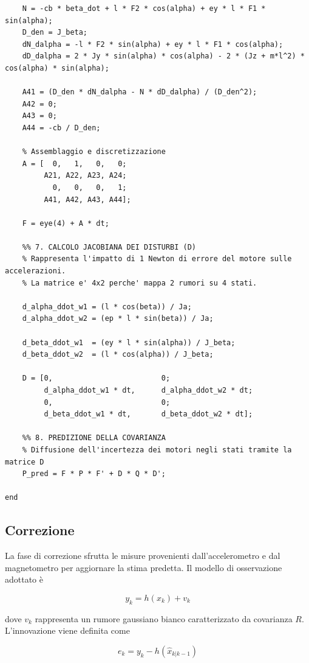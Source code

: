 \documentclass[12pt,a4paper]{article}
\begin{document}
\begin{lstlisting}[style=matlabstyle, caption={Blocco di predizione dell'EKF}, label={lst:predizione_ekf}]
    % Derivate per la riga 4 (beta_ddot)
    N = -cb * beta_dot + l * F2 * cos(alpha) + ey * l * F1 * sin(alpha);
    D_den = J_beta;
    dN_dalpha = -l * F2 * sin(alpha) + ey * l * F1 * cos(alpha);
    dD_dalpha = 2 * Jy * sin(alpha) * cos(alpha) - 2 * (Jz + m*l^2) * cos(alpha) * sin(alpha);
    
    A41 = (D_den * dN_dalpha - N * dD_dalpha) / (D_den^2);
    A42 = 0;
    A43 = 0;
    A44 = -cb / D_den;
    
    % Assemblaggio e discretizzazione
    A = [  0,   1,   0,   0;
         A21, A22, A23, A24;
           0,   0,   0,   1;
         A41, A42, A43, A44];
         
    F = eye(4) + A * dt;
    
    %% 7. CALCOLO JACOBIANA DEI DISTURBI (D)
    % Rappresenta l'impatto di 1 Newton di errore del motore sulle accelerazioni.
    % La matrice e' 4x2 perche' mappa 2 rumori su 4 stati.
    
    d_alpha_ddot_w1 = (l * cos(beta)) / Ja;
    d_alpha_ddot_w2 = (ep * l * sin(beta)) / Ja;
    
    d_beta_ddot_w1  = (ey * l * sin(alpha)) / J_beta;
    d_beta_ddot_w2  = (l * cos(alpha)) / J_beta;
    
    D = [0,                         0;
         d_alpha_ddot_w1 * dt,      d_alpha_ddot_w2 * dt;
         0,                         0;
         d_beta_ddot_w1 * dt,       d_beta_ddot_w2 * dt];
         
    %% 8. PREDIZIONE DELLA COVARIANZA
    % Diffusione dell'incertezza dei motori negli stati tramite la matrice D
    P_pred = F * P * F' + D * Q * D';
    
end
\end{lstlisting}


\subsection{Correzione}
La fase di correzione sfrutta le misure provenienti dall'accelerometro e dal magnetometro per aggiornare la stima predetta.
Il modello di osservazione adottato è

\begin{equation}
y_k = h(x_k) + v_k
\end{equation}

dove $v_k$ rappresenta un rumore gaussiano bianco caratterizzato da covarianza $R$.
L'innovazione viene definita come

\begin{equation}
e_k = y_k - h(\hat{x}_{k|k-1})
\end{equation}
\end{document}
